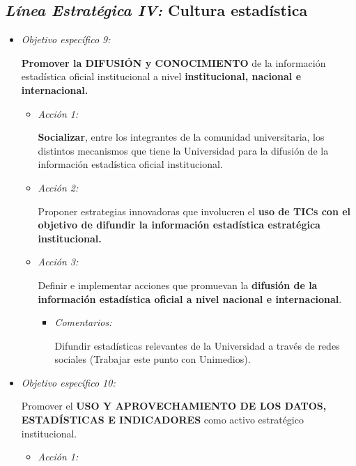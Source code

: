 \documentclass[
]{book}
\begin{document}
\hypertarget{luxednea-estratuxe9gica-iv-cultura-estaduxedstica}{%
\subsection{\texorpdfstring{\emph{Línea Estratégica IV:} Cultura estadística}{Línea Estratégica IV: Cultura estadística}}\label{luxednea-estratuxe9gica-iv-cultura-estaduxedstica}}

\begin{itemize}
\item
  \emph{Objetivo específico 9:}

  \textbf{Promover la DIFUSIÓN y CONOCIMIENTO} de la información estadística oficial institucional a nivel \textbf{institucional, nacional e internacional.}

  \begin{itemize}
  \item
    \emph{Acción 1:}

    \textbf{Socializar}, entre los integrantes de la comunidad universitaria, los distintos mecanismos que tiene la Universidad para la difusión de la información estadística oficial institucional.
  \item
    \emph{Acción 2:}

    Proponer estrategias innovadoras que involucren el \textbf{uso de TICs con el objetivo de difundir la información estadística estratégica institucional.}
  \item
    \emph{Acción 3:}

    Definir e implementar acciones que promuevan la \textbf{difusión de la información estadística oficial a nivel nacional e internacional}.

    \begin{itemize}
    \item
      \emph{Comentarios:}

      Difundir estadísticas relevantes de la Universidad a través de redes sociales (Trabajar este punto con Unimedios).
    \end{itemize}
  \end{itemize}
\item
  \emph{Objetivo específico 10:}

  Promover el \textbf{USO Y APROVECHAMIENTO DE LOS DATOS, ESTADÍSTICAS E INDICADORES} como activo estratégico institucional.

  \begin{itemize}
  \item
    \emph{Acción 1:}


\end{itemize}
\end{itemize}
\end{document}
